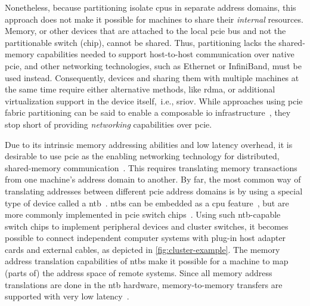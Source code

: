 Nonetheless, because partitioning isolate \glspl{cpu} in separate address domains, this approach does not make it possible for machines to share their \emph{internal} resources.
%
Memory, or other devices that are attached to the local \gls{pcie} bus and not the partitionable switch (chip), cannot be shared.
%
Thus, partitioning lacks the shared-memory capabilities needed to support host-to-host communication over native \gls{pcie}, and other networking technologies, such as Ethernet or InfiniBand, must be used instead.
%
Consequently,  devices and sharing them with multiple machines at the same time require either alternative methods, like \gls{rdma}, or additional virtualization support in the device itself,~i.e., \gls{sriov}.
%
While approaches using \gls{pcie} fabric partitioning can be said to enable a composable \gls{io} infrastructure~\cite{Chung2018}, they stop short of providing \emph{networking} capabilities over \gls{pcie}.



Due to its intrinsic memory addressing abilities and low latency overhead, it is desirable to use \gls{pcie} as the enabling networking technology for distributed, shared-memory communication~\cite{Shim2018,whitepaper:Regula2004,url:Meduri2011}.
%
This requires translating memory transactions from one machine's address domain to another.
%
By far, the most common way of translating addresses between different \gls{pcie} address domains is by using a special type of device called a \gls{ntb}~\cite{whitepaper:PLX,whitepaper:Regula2004,Hou2013,Tu2014}.
%
\Glspl{ntb} can be embedded as a \gls{cpu} feature~\cite{whitepaper:Sullivan2010,url:LinuxNTB-AMD}, but are more commonly implemented in \gls{pcie} switch chips~\cite{whitepaper:PLX,pex8733}.
%
Using such \gls{ntb}-capable switch chips to implement peripheral devices and cluster switches, it becomes possible to connect independent computer systems with plug-in host adapter cards and external cables, as depicted in \cref{fig:cluster-example}.
%
The memory address translation capabilities of \glspl{ntb} make it possible for a machine to map (parts of) the address space of remote systems.
%
Since all memory address translations are done in the \gls{ntb} hardware, memory-to-memory transfers are supported with very low latency~\cite{Lim2019,Tu2014}.



